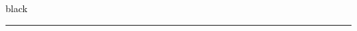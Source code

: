 \documentclass[english, bibtex]{kththesis}
\begin{document}
\textcolor{black}{black} {\color{black} \rule{\linewidth}{1mm} }

\label{pg:lastPageofMainmatter}

\clearpage
\fancyhead{}  %
\end{document}
